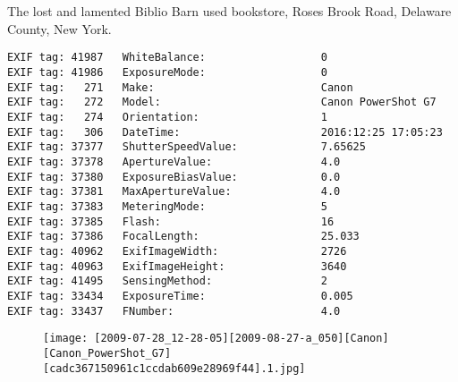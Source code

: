 \section{\protect{}}
\noindent The lost and lamented Biblio Barn used bookstore, Roses Brook Road, Delaware County, New York.
\noindent
\begin{lstlisting}
EXIF tag: 41987   WhiteBalance:                  0
EXIF tag: 41986   ExposureMode:                  0
EXIF tag:   271   Make:                          Canon
EXIF tag:   272   Model:                         Canon PowerShot G7
EXIF tag:   274   Orientation:                   1
EXIF tag:   306   DateTime:                      2016:12:25 17:05:23
EXIF tag: 37377   ShutterSpeedValue:             7.65625
EXIF tag: 37378   ApertureValue:                 4.0
EXIF tag: 37380   ExposureBiasValue:             0.0
EXIF tag: 37381   MaxApertureValue:              4.0
EXIF tag: 37383   MeteringMode:                  5
EXIF tag: 37385   Flash:                         16
EXIF tag: 37386   FocalLength:                   25.033
EXIF tag: 40962   ExifImageWidth:                2726
EXIF tag: 40963   ExifImageHeight:               3640
EXIF tag: 41495   SensingMethod:                 2
EXIF tag: 33434   ExposureTime:                  0.005
EXIF tag: 33437   FNumber:                       4.0

\end{lstlisting}
\clearpage
\begin{figure}
\raggedleft
\texttt{[image: [2009-07-28\_12-28-05][2009-08-27-a\_050][Canon][Canon\_PowerShot\_G7][cadc367150961c1ccdab609e28969f44].1.jpg]}
\end{figure}


\clearpage
